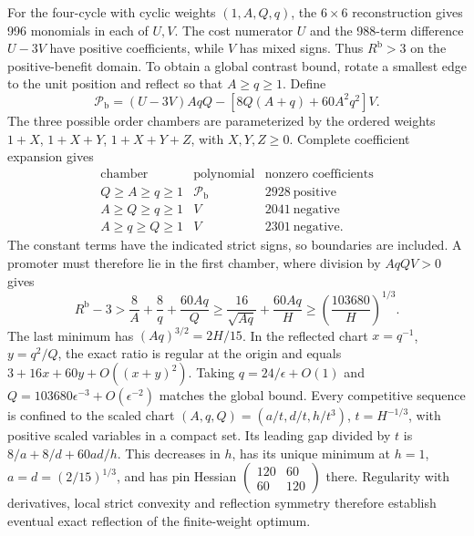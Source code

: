 \documentclass[aps,pre,reprint,amsmath,amssymb,longbibliography]{revtex4-2}
\begin{document}
For the four-cycle with cyclic weights $(1,A,Q,q)$, the
$6\times6$ reconstruction gives 996 monomials in each of $U,V$.
The cost numerator $U$ and the 988-term difference $U-3V$ have positive
coefficients, while $V$ has mixed signs. Thus
$R^{\mathrm b}>3$ on the positive-benefit domain. To obtain a
global contrast bound, rotate a smallest edge to the unit position
and reflect so that $A\ge q\ge1$. Define
\begin{equation}
 \mathcal P_{\mathrm b}
 =(U-3V)AqQ-[8Q(A+q)+60A^2q^2]V.
 \label{eq:v7-birth-c4-remainder}
\end{equation}
The three possible order chambers are parameterized by the ordered
weights $1+X$, $1+X+Y$, $1+X+Y+Z$, with $X,Y,Z\ge0$.
Complete coefficient expansion gives
\begin{equation}
 \begin{array}{c|c|c}
  \text{chamber}&\text{polynomial}&\text{nonzero coefficients}\\ \hline
  Q\ge A\ge q\ge1&\mathcal P_{\mathrm b}&2928\ \text{positive}\\
  A\ge Q\ge q\ge1&V&2041\ \text{negative}\\
  A\ge q\ge Q\ge1&V&2301\ \text{negative}.
 \end{array}
 \label{eq:v7-birth-c4-chambers}
\end{equation}
The constant terms have the indicated strict signs, so boundaries
are included. A promoter must therefore lie in the first chamber,
where division by $AqQV>0$ gives
\begin{equation}
 R^{\mathrm b}-3>
 \frac8A+\frac8q+\frac{60Aq}{Q}
 \ge\frac{16}{\sqrt{Aq}}+\frac{60Aq}{H}
 \ge\left(\frac{103680}{H}\right)^{1/3}.
 \label{eq:v7-birth-c4-global}
\end{equation}
The last minimum has $(Aq)^{3/2}=2H/15$. In the reflected chart
$x=q^{-1}$, $y=q^2/Q$, the exact ratio is regular at the origin
and equals $3+16x+60y+O((x+y)^2)$. Taking
$q=24/\epsilon+O(1)$ and
$Q=103680\epsilon^{-3}+O(\epsilon^{-2})$ matches the global bound.
Every competitive sequence is confined to the scaled chart
$(A,q,Q)=(a/t,d/t,h/t^3)$, $t=H^{-1/3}$, with positive scaled
variables in a compact set. Its leading gap divided by $t$ is
$8/a+8/d+60ad/h$. This decreases in $h$, has its unique minimum at
$h=1$, $a=d=(2/15)^{1/3}$, and has pin Hessian
$\left(\begin{smallmatrix}120&60\\60&120\end{smallmatrix}\right)$
there. Regularity with derivatives, local strict convexity and
reflection symmetry therefore establish eventual exact reflection
of the finite-weight optimum.
\end{document}
